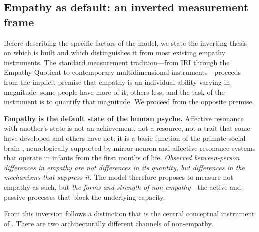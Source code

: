 \subsection{Empathy as default: an inverted measurement frame}
\label{subsec:empathy_as_default}

Before describing the specific factors of the model, we state the inverting thesis on which \DEIC{} is built and which distinguishes it from most existing empathy instruments. The standard measurement tradition---from IRI \citep[Interpersonal Reactivity Index;][]{davis1983} through the Empathy Quotient \citep{baroncohen2011} to contemporary multidimensional instruments---proceeds from the implicit premise that empathy is an individual ability varying in magnitude: some people have more of it, others less, and the task of the instrument is to quantify that magnitude. We proceed from the opposite premise.

\textbf{Empathy is the default state of the human psyche.} Affective resonance with another's state is not an achievement, not a resource, not a trait that some have developed and others have not; it is a basic function of the primate social brain \citep{rizzolatti2004, iacoboni2009, decety2011}, neurologically supported by mirror-neuron and affective-resonance systems that operate in infants from the first months of life. \emph{Observed between-person differences in empathy are not differences in its quantity, but differences in the mechanisms that suppress it.} The model therefore proposes to measure not empathy as such, but \emph{the forms and strength of non-empathy}---the active and passive processes that block the underlying capacity.

From this inversion follows a distinction that is the central conceptual instrument of \DEIC{}. There are two architecturally different channels of non-empathy.

